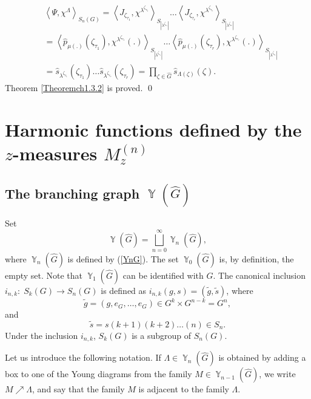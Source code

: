 \documentclass[12pt]{amsart}
\theoremstyle{definition}
\numberwithin{equation}{section}
\DeclareMathOperator{\Y}{\mathbb{Y}}
\begin{document}
\begin{equation}
\begin{split}
&\left<\Psi,\chi^{\Lambda}\right>_{S_n(G)}=
\left<J_{\zeta_{\tau_1}},\chi^{\lambda^{\zeta_{\tau_1}}}\right>_{S_{|\lambda^{\zeta_{\tau_1}}|}}
\ldots\left<J_{\zeta_{\tau_r}},\chi^{\lambda^{\zeta_{\tau_r}}}\right>_{S_{|\lambda^{\zeta_{\tau_r}}|}}\\
&=\left<\widehat{p}_{\mu(.)}(\zeta_{\tau_1}),\chi^{\lambda^{\zeta_{\tau_1}}}(.)\right>_{S_{|\lambda^{\zeta_{\tau_1}}|}}
\ldots\left<\widehat{p}_{\mu(.)}(\zeta_{\tau_r}),\chi^{\lambda^{\zeta_{\tau_r}}}(.)\right>_{S_{|\lambda^{\zeta_{\tau_r}}|}}\\
&=\widehat{s}_{\lambda^{\zeta_{\tau_1}}}(\zeta_{\tau_1})\ldots\widehat{s}_{\lambda^{\zeta_{\tau_r}}}(\zeta_{\tau_r})
=\prod\limits_{\zeta\in\widehat{G}}\widehat{s}_{\Lambda(\zeta)}(\zeta).
\end{split}
\end{equation}
Theorem \ref{Theoremch1.3.2} is proved. \qed
\section{Harmonic functions defined by the $z$-measures $M_z^{(n)}$}\label{SECTIONHF1}
\subsection{The branching graph $\Y(\widehat{G})$}
Set
\begin{equation}\label{4.1.2}
\Y(\widehat{G})=\bigsqcup\limits_{n=0}^{\infty}\Y_n(\widehat{G}),
\end{equation}
where $\Y_n(\widehat{G})$ is defined by (\ref{YnG}).
The set $\Y_0(\widehat{G})$ is, by definition, the empty set. Note that $\Y_1(\widehat{G})$ can be identified
with $\widehat{G}$. The canonical inclusion $i_{n,k}:\; S_k(G)\rightarrow S_n(G)$ is defined as
$i_{n,k}(g,s)=(\tilde{g},\tilde{s})$, where
$$
\tilde{g}=(g,e_{G},\ldots,e_{G})\in G^k\times G^{n-k}=G^n,
$$
and
$$
\tilde{s}=s(k+1)(k+2)\ldots(n)\in S_n.
$$
Under the inclusion $i_{n,k}$, $S_k(G)$ is a subgroup of $S_n(G)$.

Let us introduce the following notation. If $\Lambda\in\Y_n(\widehat{G})$ is obtained by adding a box to one of the Young diagrams from the family $M\in\Y_{n-1}(\widehat{G})$, we write
$M\nearrow\Lambda$, and say that the family $M$ is adjacent to the family $\Lambda$.
\end{document}
